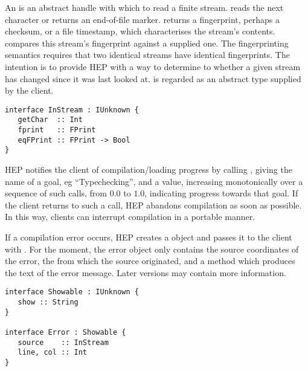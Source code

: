 An \verb@InStream@ is an abstract handle with which to read a finite stream.
\verb@getChar@ reads the next character or returns an end-of-file
marker.  \verb@fprint@ returns a fingerprint, perhaps a checksum,
or a file timestamp,
which characterises the stream's contents.  \verb@eqFPrint@ compares
this stream's fingerprint against a supplied one.  The fingerprinting
semantics requires that two identical streams have identical
fingerprints.   The intention is to provide HEP with a 
way to determine to whether a given stream has changed since it was
last looked at.  \verb@FPrint@ is regarded as an abstract type
supplied by the client.
\begin{verbatim}
interface InStream : IUnknown {
   getChar  :: Int
   fprint   :: FPrint
   eqFPrint :: FPrint -> Bool
}
\end{verbatim}

HEP notifies the client of compilation/loading progress by calling
\verb@setProgress@, giving the name of a goal, eg ``Typechecking'',
and a value, increasing monotonically over a sequence of such calls,
from $0.0$ to $1.0$, indicating progress towards that goal.
If the client returns \verb@True@ to such a call, HEP abandons 
compilation as soon as possible.  In this way, clients can
interrupt compilation in a portable manner.

If a compilation error occurs, HEP creates a \verb@Error@ object
and passes it to the client with \verb@error@.  For the moment,
the error object only contains the source coordinates of the
error, the \verb@InStream@ from which the source originated,
and a method \verb@show@ which produces the text of the error message.
Later versions may contain more information.
\begin{verbatim}
interface Showable : IUnknown { 
   show :: String
}

interface Error : Showable {
   source    :: InStream
   line, col :: Int
}
\end{verbatim}

